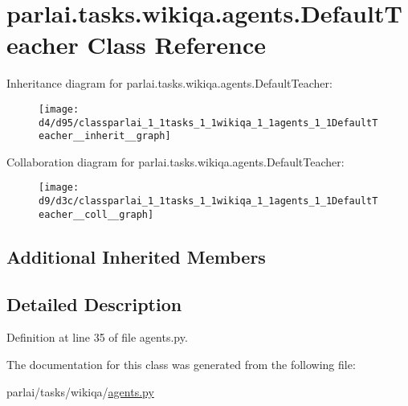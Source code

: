 \hypertarget{classparlai_1_1tasks_1_1wikiqa_1_1agents_1_1DefaultTeacher}{}\section{parlai.\+tasks.\+wikiqa.\+agents.\+Default\+Teacher Class Reference}
\label{classparlai_1_1tasks_1_1wikiqa_1_1agents_1_1DefaultTeacher}


Inheritance diagram for parlai.\+tasks.\+wikiqa.\+agents.\+Default\+Teacher\+:
\nopagebreak
\begin{figure}[H]
\begin{center}
\leavevmode
\texttt{[image: d4/d95/classparlai\_1\_1tasks\_1\_1wikiqa\_1\_1agents\_1\_1DefaultTeacher\_\_inherit\_\_graph]}
\end{center}
\end{figure}


Collaboration diagram for parlai.\+tasks.\+wikiqa.\+agents.\+Default\+Teacher\+:
\nopagebreak
\begin{figure}[H]
\begin{center}
\leavevmode
\texttt{[image: d9/d3c/classparlai\_1\_1tasks\_1\_1wikiqa\_1\_1agents\_1\_1DefaultTeacher\_\_coll\_\_graph]}
\end{center}
\end{figure}
\subsection*{Additional Inherited Members}


\subsection{Detailed Description}


Definition at line 35 of file agents.\+py.



The documentation for this class was generated from the following file\+:\begin{DoxyCompactItemize}
\item 
parlai/tasks/wikiqa/\hyperlink{parlai_2tasks_2wikiqa_2agents_8py}{agents.\+py}\end{DoxyCompactItemize}
